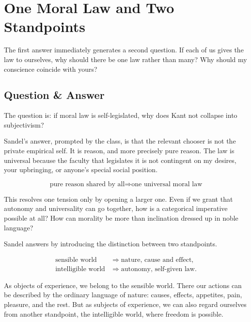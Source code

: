\section{One Moral Law and Two Standpoints}

The first answer immediately generates a second question. If each of us gives the law to ourselves, why should there be one law rather than many? Why should my conscience coincide with yours?

\subsection{Question \& Answer}

The question is: if moral law is self-legislated, why does Kant not collapse into subjectivism?

Sandel's answer, prompted by the class, is that the relevant chooser is not the private empirical self. It is reason, and more precisely pure reason. The law is universal because the faculty that legislates it is not contingent on my desires, your upbringing, or anyone's special social position.

\begin{equation}
\text{pure reason shared by all} \Longrightarrow \text{one universal moral law}
\end{equation}

This resolves one tension only by opening a larger one. Even if we grant that autonomy and universality can go together, how is a categorical imperative possible at all? How can morality be more than inclination dressed up in noble language?

Sandel answers by introducing the distinction between two standpoints.

\begin{align}
\text{sensible world} &\Longrightarrow \text{nature, cause and effect}, \\
\text{intelligible world} &\Longrightarrow \text{autonomy, self-given law}.
\end{align}

As objects of experience, we belong to the sensible world. There our actions can be described by the ordinary language of nature: causes, effects, appetites, pain, pleasure, and the rest. But as subjects of experience, we can also regard ourselves from another standpoint, the intelligible world, where freedom is possible.

\begin{figure}[h]
\centering
{}
\end{figure}

